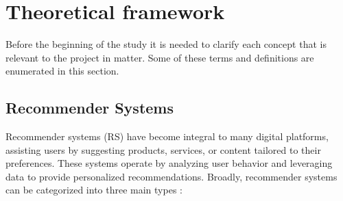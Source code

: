\documentclass[10pt,twocolumn,letterpaper]{article}
\begin{document}


\section{Theoretical framework}
Before the beginning of the study it is needed to clarify each concept that is relevant to the project in matter. Some of these terms and definitions are enumerated in this section.

\subsection{Recommender Systems}
Recommender systems (RS) have become integral to many digital platforms, assisting users by suggesting products, services, or content tailored to their preferences. These systems operate by analyzing user behavior and leveraging data to provide personalized recommendations. Broadly, recommender systems can be categorized into three main types \cite{recommenderSystems}:
\end{document}
